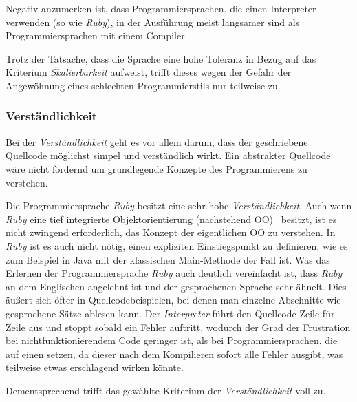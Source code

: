\documentclass[12pt,DIV=14, version=first, BCOR=10mm,a4paper,twoside,parskip=half-,headsepline,headinclude]{scrartcl}
\begin{document}
\begin{flushleft}
Negativ anzumerken ist, dass Programmiersprachen, die einen Interpreter verwenden (so wie \textit{\glqq Ruby\grqq}), in der Ausführung meist langsamer sind als Programmiersprachen mit einem Compiler.

Trotz der Tatsache, dass die Sprache eine hohe Toleranz in Bezug auf das Kriterium \textit{Skalierbarkeit} aufweist, trifft dieses wegen der Gefahr der Angewöhnung eines schlechten Programmierstils nur teilweise zu.

\end{flushleft}

\subsubsection{Verständlichkeit} \label{Verständlichkeit}
\begin{flushleft}
Bei der \textit{Verständlichkeit} geht es vor allem darum, dass der geschriebene Quellcode möglichst simpel und verständlich wirkt. Ein abstrakter Quellcode wäre nicht fördernd um grundlegende Konzepte des Programmierens zu verstehen.

Die Programmiersprache \textit{\glqq Ruby\grqq} besitzt eine sehr hohe \textit{Verständlichkeit}. Auch wenn \textit{\glqq Ruby\grqq} eine tief integrierte Objektorientierung (nachstehend \glqq OO\grqq) \, besitzt, ist es nicht zwingend erforderlich, das Konzept der eigentlichen OO zu verstehen. In \textit{\glqq Ruby\grqq} ist es auch nicht nötig, einen expliziten Einstiegspunkt zu definieren, wie es zum Beispiel in Java mit der klassischen Main-Methode der Fall ist. Was das Erlernen der Programmiersprache \textit{\glqq Ruby\grqq} auch deutlich vereinfacht ist, dass \textit{\glqq Ruby\grqq} an dem Englischen angelehnt ist und der gesprochenen Sprache sehr ähnelt. Dies äußert sich öfter in Quellcodebeispielen, bei denen man einzelne Abschnitte wie gesprochene Sätze ablesen kann. Der \textit{Interpreter} führt den Quellcode Zeile für Zeile aus und stoppt sobald ein Fehler auftritt, wodurch der Grad der Frustration bei nichtfunktionierendem Code geringer ist, als bei Programmiersprachen, die auf einen  setzen, da dieser nach dem Kompilieren sofort alle Fehler ausgibt, was teilweise etwas erschlagend wirken könnte.

Dementsprechend trifft das gewählte Kriterium der \textit{Verständlichkeit} voll zu.
\end{flushleft}
\end{document}
